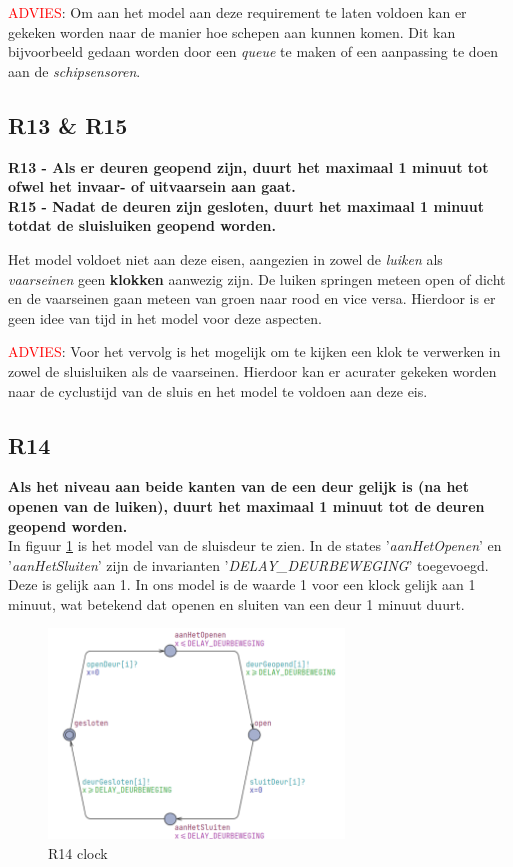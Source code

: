 \documentclass{article} %
\begin{document}
\textcolor{red}{ADVIES}: Om aan het model aan deze requirement te laten voldoen kan er gekeken worden naar de manier hoe schepen aan kunnen komen. Dit kan bijvoorbeeld gedaan worden door een \textit{queue} te maken of een aanpassing te doen aan de \textit{schipsensoren}.

\subsection{R13 \& R15}
\textbf{R13 - Als er deuren geopend zijn, duurt het maximaal 1 minuut tot ofwel het invaar- of uitvaarsein aan gaat.} \\
\textbf{R15 - Nadat de deuren zijn gesloten, duurt het maximaal 1 minuut totdat de sluisluiken geopend worden.} \par

Het model voldoet niet aan deze eisen, aangezien in zowel de \textit{luiken} als \textit{vaarseinen} geen \textbf{klokken} aanwezig zijn. De luiken springen meteen open of dicht en de vaarseinen gaan meteen van groen naar rood en vice versa. Hierdoor is er geen idee van tijd in het model voor deze aspecten.

\textcolor{red}{ADVIES}: Voor het vervolg is het mogelijk om te kijken een klok te verwerken in zowel de sluisluiken als de vaarseinen. Hierdoor kan er acurater gekeken worden naar de cyclustijd van de sluis en het model te voldoen aan deze eis. \par

\subsection{R14}
\textbf{Als het niveau aan beide kanten van de een deur gelijk is (na het openen van de luiken), duurt het maximaal 1 minuut tot de deuren geopend worden.}\\
In figuur \ref{r14} is het model van de sluisdeur te zien. In de states '\textit{aanHetOpenen}' en '\textit{aanHetSluiten}' zijn de invarianten '\textit{DELAY\_DEURBEWEGING}' toegevoegd. Deze is gelijk aan 1. In ons model is de waarde 1 voor een klock gelijk aan 1 minuut, wat betekend dat openen en sluiten van een deur 1 minuut duurt. \par
\begin{figure}[h]
    \centering
    \includegraphics[width=0.7\textwidth]{R14.png}
    \caption{R14 clock}
    \label{r14}
\end{figure}
\newpage
\end{document}
